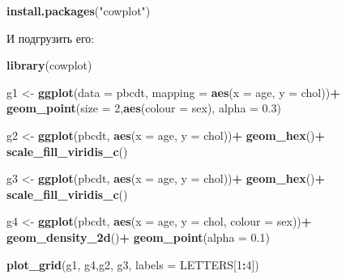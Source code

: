 \documentclass[]{book}
\newenvironment{Shaded}{\begin{snugshade}}{\end{snugshade}}
\newcommand{\KeywordTok}[1]{\textcolor[rgb]{0.13,0.29,0.53}{\textbf{#1}}}
\newcommand{\DataTypeTok}[1]{\textcolor[rgb]{0.13,0.29,0.53}{#1}}
\newcommand{\DecValTok}[1]{\textcolor[rgb]{0.00,0.00,0.81}{#1}}
\newcommand{\FloatTok}[1]{\textcolor[rgb]{0.00,0.00,0.81}{#1}}
\newcommand{\StringTok}[1]{\textcolor[rgb]{0.31,0.60,0.02}{#1}}
\newcommand{\OperatorTok}[1]{\textcolor[rgb]{0.81,0.36,0.00}{\textbf{#1}}}
\newcommand{\NormalTok}[1]{#1}
\begin{document}
\begin{Shaded}
\begin{Highlighting}[]
\KeywordTok{install.packages}\NormalTok{(}\StringTok{"cowplot"}\NormalTok{)}
\end{Highlighting}
\end{Shaded}

И подгрузить его:

\begin{Shaded}
\begin{Highlighting}[]
\KeywordTok{library}\NormalTok{(cowplot)}
\end{Highlighting}
\end{Shaded}

\begin{Shaded}
\begin{Highlighting}[]
\NormalTok{g1 <-}\StringTok{ }\KeywordTok{ggplot}\NormalTok{(}\DataTypeTok{data =}\NormalTok{ pbcdt, }\DataTypeTok{mapping =} \KeywordTok{aes}\NormalTok{(}\DataTypeTok{x =}\NormalTok{ age, }\DataTypeTok{y =}\NormalTok{ chol))}\OperatorTok{+}
\StringTok{  }\KeywordTok{geom_point}\NormalTok{(}\DataTypeTok{size =} \DecValTok{2}\NormalTok{,}\KeywordTok{aes}\NormalTok{(}\DataTypeTok{colour =}\NormalTok{ sex), }\DataTypeTok{alpha =} \FloatTok{0.3}\NormalTok{)}

\NormalTok{g2 <-}\StringTok{ }\KeywordTok{ggplot}\NormalTok{(pbcdt, }\KeywordTok{aes}\NormalTok{(}\DataTypeTok{x =}\NormalTok{ age, }\DataTypeTok{y =}\NormalTok{ chol))}\OperatorTok{+}
\StringTok{  }\KeywordTok{geom_hex}\NormalTok{()}\OperatorTok{+}
\StringTok{  }\KeywordTok{scale_fill_viridis_c}\NormalTok{()}

\NormalTok{g3 <-}\StringTok{ }\KeywordTok{ggplot}\NormalTok{(pbcdt, }\KeywordTok{aes}\NormalTok{(}\DataTypeTok{x =}\NormalTok{ age, }\DataTypeTok{y =}\NormalTok{ chol))}\OperatorTok{+}
\StringTok{  }\KeywordTok{geom_hex}\NormalTok{()}\OperatorTok{+}
\StringTok{  }\KeywordTok{scale_fill_viridis_c}\NormalTok{()}

\NormalTok{g4 <-}\StringTok{ }\KeywordTok{ggplot}\NormalTok{(pbcdt, }\KeywordTok{aes}\NormalTok{(}\DataTypeTok{x =}\NormalTok{ age, }\DataTypeTok{y =}\NormalTok{ chol, }\DataTypeTok{colour =}\NormalTok{ sex))}\OperatorTok{+}
\StringTok{  }\KeywordTok{geom_density_2d}\NormalTok{()}\OperatorTok{+}
\StringTok{  }\KeywordTok{geom_point}\NormalTok{(}\DataTypeTok{alpha =} \FloatTok{0.1}\NormalTok{)}
\end{Highlighting}
\end{Shaded}

\begin{Shaded}
\begin{Highlighting}[]
\KeywordTok{plot_grid}\NormalTok{(g1, g4,g2, g3, }\DataTypeTok{labels =}\NormalTok{ LETTERS[}\DecValTok{1}\OperatorTok{:}\DecValTok{4}\NormalTok{])}
\end{Highlighting}
\end{Shaded}
\end{document}
